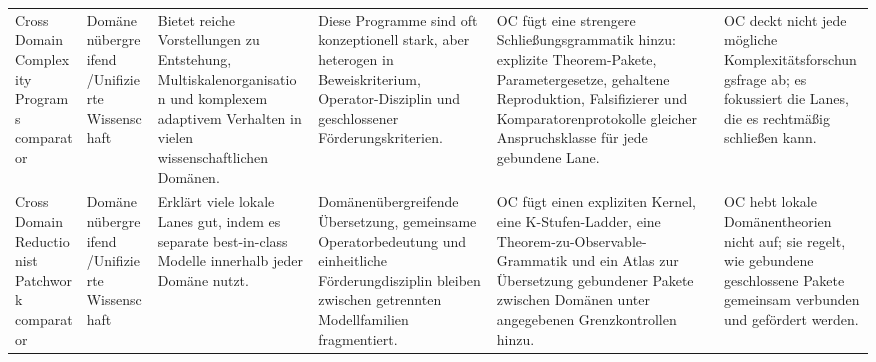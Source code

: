 \begin{longtable}{@{}L{0.17\textwidth}L{0.09\textwidth}L{0.17\textwidth}L{0.17\textwidth}L{0.20\textwidth}L{0.14\textwidth}@{}}
Cross Domain Complexity Programs comparator & Domänenübergreifend /\allowbreak Unifizierte Wissenschaft & Bietet reiche Vorstellungen zu Entstehung, Multiskalenorganisation und komplexem adaptivem Verhalten in vielen wissenschaftlichen Domänen. & Diese Programme sind oft konzeptionell stark, aber heterogen in Beweiskriterium, Operator-Disziplin und geschlossener Förderungskriterien. & OC fügt eine strengere Schließungsgrammatik hinzu: explizite Theorem-Pakete, Parametergesetze, gehaltene Reproduktion, Falsifizierer und Komparatorenprotokolle gleicher Anspruchsklasse für jede gebundene Lane. & OC deckt nicht jede mögliche Komplexitätsforschungsfrage ab; es fokussiert die Lanes, die es rechtmäßig schließen kann. \\
Cross Domain Reductionist Patchwork comparator & Domänenübergreifend /\allowbreak Unifizierte Wissenschaft & Erklärt viele lokale Lanes gut, indem es separate best-in-class Modelle innerhalb jeder Domäne nutzt. & Domänenübergreifende Übersetzung, gemeinsame Operatorbedeutung und einheitliche Förderungdisziplin bleiben zwischen getrennten Modellfamilien fragmentiert. & OC fügt einen expliziten Kernel, eine K-Stufen-Ladder, eine Theorem-zu-Observable-Grammatik und ein Atlas zur Übersetzung gebundener Pakete zwischen Domänen unter angegebenen Grenzkontrollen hinzu. & OC hebt lokale Domänentheorien nicht auf; sie regelt, wie gebundene geschlossene Pakete gemeinsam verbunden und gefördert werden. \\
\bottomrule
\end{longtable}
\endgroup

